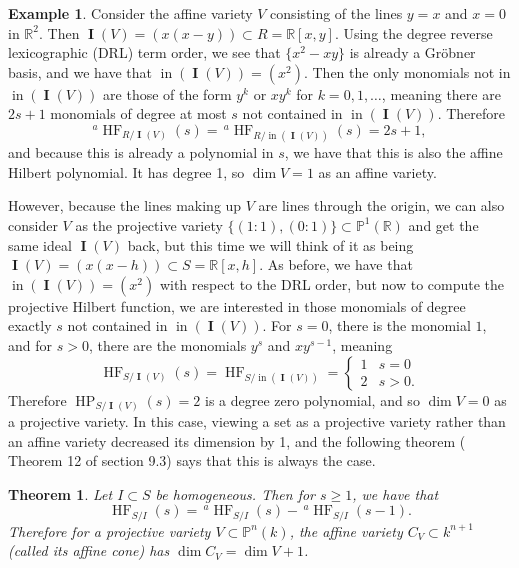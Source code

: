 \documentclass[11pt]{article}
\newcommand{\R}{\mathbb{R}}
\newcommand{\Proj}{\mathbb{P}}
\DeclareMathOperator{\HF}{HF}
\DeclareMathOperator{\HP}{HP}
\DeclareMathOperator{\init}{in}
\DeclareMathOperator{\I}{\mathbf{I}}
\newtheorem{theorem}{Theorem}
\theoremstyle{definition}
\newtheorem{example}{Example}
\begin{document}
\begin{example}
	Consider the affine variety $V$ consisting of the lines $y = x$ and $x = 0$ in $\R^2$. Then $\I(V) = (x(x - y)) \subset R = \R[x,y]$. Using the degree reverse lexicographic (DRL) term order, we see that $\{x^2 - xy\}$ is already a Gröbner basis, and we have that $\init(\I(V)) = (x^2)$. Then the only monomials not in $\init(\I(V))$ are those of the form $y^k$ or $xy^k$ for $k = 0, 1, \dots$, meaning there are $2s + 1$ monomials of degree at most $s$ not contained in $\init(\I(V))$. Therefore \[ ^a\HF_{R/\I(V)}(s) = \,^a\HF_{R/\init(\I(V))}(s) = 2s + 1, \] and because this is already a polynomial in $s$, we have that this is also the affine Hilbert polynomial. It has degree 1, so $\dim V = 1$ as an affine variety. 

	However, because the lines making up $V$ are lines through the origin, we can also consider $V$ as the projective variety $\{(1:1), (0:1)\} \subset \Proj^1(\R)$ and get the same ideal $\I(V)$ back, but this time we will think of it as being $\I(V) = (x(x - h)) \subset S = \R[x,h]$. As before, we have that $\init(\I(V)) = (x^2)$ with respect to the DRL order, but now to compute the projective Hilbert function, we are interested in those monomials of degree exactly $s$ not contained in $\init(\I(V))$. For $s = 0$, there is the monomial $1$, and for $s > 0$, there are the monomials $y^s$ and $xy^{s - 1}$, meaning \[ \HF_{S/\I(V)}(s) = \HF_{S/\init(\I(V))} = \begin{cases}
		1 & s = 0 \\
		2 & s > 0.
	\end{cases} \] Therefore $\HP_{S/\I(V)}(s) = 2$ is a degree zero polynomial, and so $\dim V = 0$ as a projective variety. In this case, viewing a set as a projective variety rather than an affine variety decreased its dimension by 1, and the following theorem (\cite{cox2013ideals} Theorem 12 of section 9.3) says that this is always the case. 
\end{example}


\begin{theorem}
	Let $I \subset S$ be homogeneous. Then for $s \geq 1$, we have that \[ \HF_{S/I}(s) = \,^a\HF_{S/I}(s) - \, ^a\HF_{S/I}(s - 1). \] Therefore for a projective variety $V \subset \Proj^n(k)$, the affine variety $C_V \subset k^{n+1}$ (called its affine cone) has $\dim C_V = \dim V + 1$. 
\end{theorem}
\end{document}
